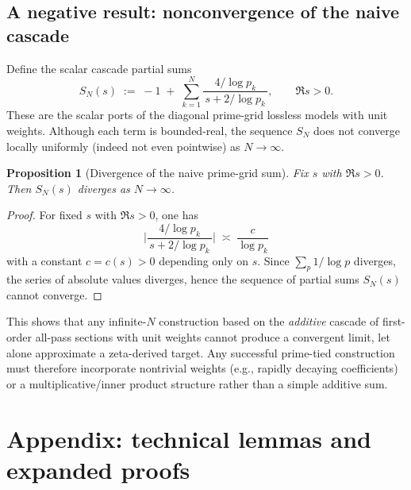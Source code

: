 \documentclass[11pt]{article}
\newtheorem{proposition}[theorem]{Proposition}
\theoremstyle{remark}
\begin{document}
\subsection*{A negative result: nonconvergence of the naive cascade}
Define the scalar cascade partial sums
\[
 S_N(s)\;:=\;-1\; +\;\sum_{k=1}^{N} \frac{4/\log p_k}{\,s+2/\log p_k\,},\qquad \Re s>0.
\]
These are the scalar ports of the diagonal prime-grid lossless models with unit weights. Although each term is bounded-real, the sequence \(S_N\) does not converge locally uniformly (indeed not even pointwise) as \(N\to\infty\).

\begin{proposition}[Divergence of the naive prime-grid sum]\label{prop:divergence}
Fix \(s\) with \(\Re s>0\). Then \(S_N(s)\) diverges as \(N\to\infty\).
\end{proposition}
\begin{proof}
For fixed \(s\) with \(\Re s>0\), one has
\[
 \Big|\frac{4/\log p_k}{\,s+2/\log p_k\,}\Big|\;\asymp\; \frac{c}{\log p_k}
\]
with a constant \(c=c(s)>0\) depending only on \(s\). Since \(\sum_{p}\!1/\log p\) diverges, the series of absolute values diverges, hence the sequence of partial sums \(S_N(s)\) cannot converge.
\end{proof}

\noindent This shows that any infinite-$N$ construction based on the \emph{additive} cascade of first-order all-pass sections with unit weights cannot produce a convergent limit, let alone approximate a zeta-derived target. Any successful prime-tied construction must therefore incorporate nontrivial weights (e.g., rapidly decaying coefficients) or a multiplicative/inner product structure rather than a simple additive sum.

\appendix
\section{Appendix: technical lemmas and expanded proofs}\label{sec:appendix}
\end{document}
